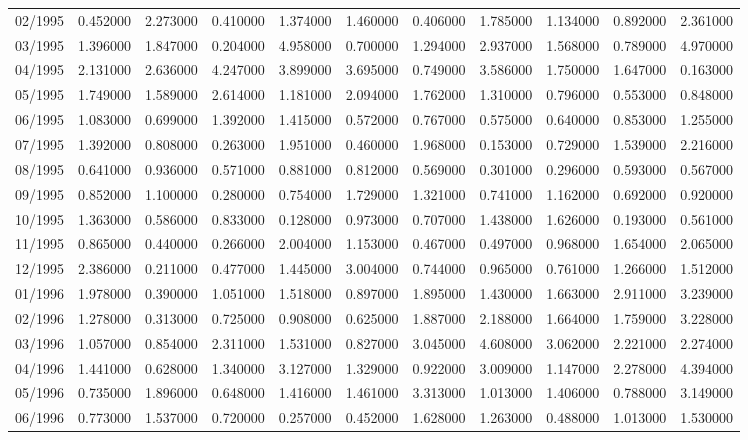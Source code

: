 \begin{tabular}{lrrrrrrrrrr}
02/1995 & 0.452000 & 2.273000 & 0.410000 & 1.374000 & 1.460000 & 0.406000 & 1.785000 & 1.134000 & 0.892000 & 2.361000 \\
03/1995 & 1.396000 & 1.847000 & 0.204000 & 4.958000 & 0.700000 & 1.294000 & 2.937000 & 1.568000 & 0.789000 & 4.970000 \\
04/1995 & 2.131000 & 2.636000 & 4.247000 & 3.899000 & 3.695000 & 0.749000 & 3.586000 & 1.750000 & 1.647000 & 0.163000 \\
05/1995 & 1.749000 & 1.589000 & 2.614000 & 1.181000 & 2.094000 & 1.762000 & 1.310000 & 0.796000 & 0.553000 & 0.848000 \\
06/1995 & 1.083000 & 0.699000 & 1.392000 & 1.415000 & 0.572000 & 0.767000 & 0.575000 & 0.640000 & 0.853000 & 1.255000 \\
07/1995 & 1.392000 & 0.808000 & 0.263000 & 1.951000 & 0.460000 & 1.968000 & 0.153000 & 0.729000 & 1.539000 & 2.216000 \\
08/1995 & 0.641000 & 0.936000 & 0.571000 & 0.881000 & 0.812000 & 0.569000 & 0.301000 & 0.296000 & 0.593000 & 0.567000 \\
09/1995 & 0.852000 & 1.100000 & 0.280000 & 0.754000 & 1.729000 & 1.321000 & 0.741000 & 1.162000 & 0.692000 & 0.920000 \\
10/1995 & 1.363000 & 0.586000 & 0.833000 & 0.128000 & 0.973000 & 0.707000 & 1.438000 & 1.626000 & 0.193000 & 0.561000 \\
11/1995 & 0.865000 & 0.440000 & 0.266000 & 2.004000 & 1.153000 & 0.467000 & 0.497000 & 0.968000 & 1.654000 & 2.065000 \\
12/1995 & 2.386000 & 0.211000 & 0.477000 & 1.445000 & 3.004000 & 0.744000 & 0.965000 & 0.761000 & 1.266000 & 1.512000 \\
01/1996 & 1.978000 & 0.390000 & 1.051000 & 1.518000 & 0.897000 & 1.895000 & 1.430000 & 1.663000 & 2.911000 & 3.239000 \\
02/1996 & 1.278000 & 0.313000 & 0.725000 & 0.908000 & 0.625000 & 1.887000 & 2.188000 & 1.664000 & 1.759000 & 3.228000 \\
03/1996 & 1.057000 & 0.854000 & 2.311000 & 1.531000 & 0.827000 & 3.045000 & 4.608000 & 3.062000 & 2.221000 & 2.274000 \\
04/1996 & 1.441000 & 0.628000 & 1.340000 & 3.127000 & 1.329000 & 0.922000 & 3.009000 & 1.147000 & 2.278000 & 4.394000 \\
05/1996 & 0.735000 & 1.896000 & 0.648000 & 1.416000 & 1.461000 & 3.313000 & 1.013000 & 1.406000 & 0.788000 & 3.149000 \\
06/1996 & 0.773000 & 1.537000 & 0.720000 & 0.257000 & 0.452000 & 1.628000 & 1.263000 & 0.488000 & 1.013000 & 1.530000 \\

\end{tabular}
